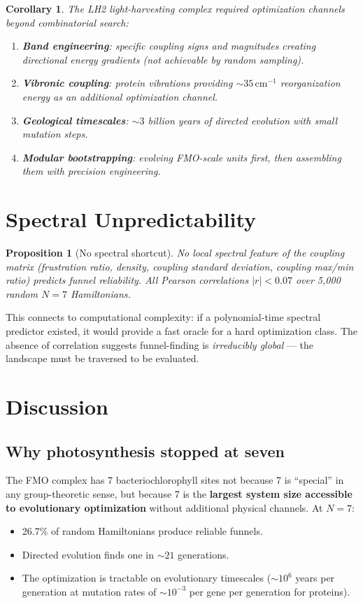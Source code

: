 \documentclass[11pt]{amsart}
\newtheorem{proposition}[theorem]{Proposition}
\newtheorem{corollary}[theorem]{Corollary}
\theoremstyle{definition}
\begin{document}
\begin{corollary}
The LH2 light-harvesting complex required optimization channels beyond combinatorial search:
\begin{enumerate}[label=(\roman*)]
\item \textbf{Band engineering}: specific coupling signs and magnitudes creating directional energy gradients (not achievable by random sampling).
\item \textbf{Vibronic coupling}: protein vibrations providing $\sim 35\,\mathrm{cm}^{-1}$ reorganization energy as an additional optimization channel.
\item \textbf{Geological timescales}: $\sim 3$ billion years of directed evolution with small mutation steps.
\item \textbf{Modular bootstrapping}: evolving FMO-scale units first, then assembling them with precision engineering.
\end{enumerate}
\end{corollary}

\section{Spectral Unpredictability}

\begin{proposition}[No spectral shortcut]
No local spectral feature of the coupling matrix (frustration ratio, density, coupling standard deviation, coupling max/min ratio) predicts funnel reliability. All Pearson correlations $|r| < 0.07$ over 5{,}000 random $N = 7$ Hamiltonians.
\end{proposition}

This connects to computational complexity: if a polynomial-time spectral predictor existed, it would provide a fast oracle for a hard optimization class. The absence of correlation suggests funnel-finding is \emph{irreducibly global} --- the landscape must be traversed to be evaluated.

\section{Discussion}

\subsection{Why photosynthesis stopped at seven}

The FMO complex has 7 bacteriochlorophyll sites not because 7 is ``special'' in any group-theoretic sense, but because 7 is the \textbf{largest system size accessible to evolutionary optimization} without additional physical channels. At $N = 7$:
\begin{itemize}
\item 26.7\% of random Hamiltonians produce reliable funnels.
\item Directed evolution finds one in $\sim 21$ generations.
\item The optimization is tractable on evolutionary timescales ($\sim 10^6$ years per generation at mutation rates of $\sim 10^{-3}$ per gene per generation for proteins).
\end{itemize}
\end{document}
